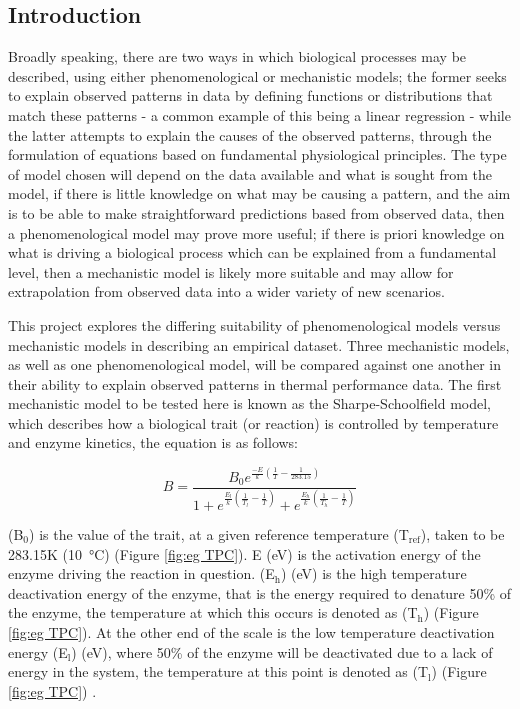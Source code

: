 \documentclass[a4paper, 11pt]{article}
\begin{document}
\doublespacing
\begin{linenumbers}

\tableofcontents
\newpage


\section{Introduction}

Broadly speaking, there are two ways in which biological processes may be described, using either phenomenological or mechanistic models; the former seeks to explain observed patterns in data by defining functions or distributions that match these patterns - a common example of this being a linear regression - while the latter attempts to explain the causes of the observed patterns, through the formulation of equations based on  fundamental physiological principles. The type of model chosen will depend on the data available and what is sought from the model, if there is little knowledge on what may be causing a pattern, and the aim is to be able to make straightforward predictions based from observed data, then a phenomenological model may prove more useful; if there is priori knowledge on what is driving a biological process which can be explained from a fundamental level, then a mechanistic model is likely more suitable and may allow for extrapolation from observed data into a wider variety of new scenarios.
 
This project explores the differing suitability of phenomenological models versus mechanistic models in describing an empirical dataset.  Three mechanistic models, as well as one phenomenological model, will be compared against one another in their ability to explain observed patterns in thermal performance data. The first mechanistic model to be tested here is known as the Sharpe-Schoolfield model, which describes how a biological trait (or reaction) is controlled by temperature and enzyme kinetics, the equation is as follows:

\begin{equation}
	B = \frac{B_{0}e^{\frac{-E}{k}(\frac{1}{T} - \frac{1}{283.15})}}{1 + e^{\frac{E_{l}}{k}(\frac{1}{T_{l}} - \frac{1}{T})} + e^{\frac{E_{h}}{k}(\frac{1}{T_{h}} - \frac{1}{T})}}
    \label{eqt:ShSc}
\end{equation}

(B$_{\text{0}}$)  is the value of the trait, at a given reference temperature (T$_{\text{ref}}$),  taken to be 283.15K (\SI{10}{\celsius}) (Figure \ref{fig:eg TPC}). E (eV) is the activation energy of the enzyme driving the reaction in question. (E$_{\text{h}}$) (eV) is the high temperature deactivation energy of the enzyme, that is the energy required to  denature  50\% of the enzyme, the temperature at which this occurs is denoted as (T$_{\text{h}}$) (Figure \ref{fig:eg TPC}). At the other end of the scale is the low temperature deactivation energy (E$_{\text{l}}$) (eV), where 50\% of the enzyme will be deactivated due to a lack of energy in the system, the temperature at this point is denoted as (T$_{\text{l}}$) (Figure \ref{fig:eg TPC}) \citep{schoolfield}.  


\end{linenumbers}
\end{document}

